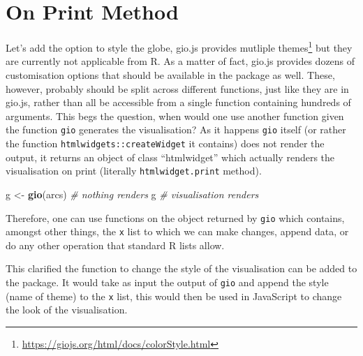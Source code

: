 \documentclass[
]{krantz}
\makeatletter
\newenvironment{Shaded}{\begin{snugshade}}{\end{snugshade}}
\newcommand{\CommentTok}[1]{\textcolor[rgb]{0.37,0.37,0.37}{\textit{#1}}}
\newcommand{\KeywordTok}[1]{\textcolor[rgb]{0.27,0.27,0.27}{\textbf{#1}}}
\newcommand{\NormalTok}[1]{#1}
\newcommand{\OperatorTok}[1]{\textcolor[rgb]{0.43,0.43,0.43}{\textbf{#1}}}
\newcommand{\StringTok}[1]{\textcolor[rgb]{0.5,0.5,0.5}{#1}}
\renewcommand{\href}[2]{#2\footnote{\url{#1}}}
\newenvironment{kframe}{%
\medskip{}
\setlength{\fboxsep}{.8em}
 \def\at@end@of@kframe{}%
 \ifinner\ifhmode%
  \def\at@end@of@kframe{\end{minipage}}%
  \begin{minipage}{\columnwidth}%
 \fi\fi%
 \def\FrameCommand##1{\hskip\@totalleftmargin \hskip-\fboxsep
 \colorbox{shadecolor}{##1}\hskip-\fboxsep
     \hskip-\linewidth \hskip-\@totalleftmargin \hskip\columnwidth}%
 \MakeFramed {\advance\hsize-\width
   \@totalleftmargin\z@ \linewidth\hsize
   \@setminipage}}%
 {\par\unskip\endMakeFramed%
 \at@end@of@kframe}
\renewenvironment{Shaded}{\begin{kframe}}{\end{kframe}}
\makeatother
\begin{document}
\hypertarget{widgets-full-on-print}{%
\section{On Print Method}\label{widgets-full-on-print}}

Let's add the option to style the globe, gio.js provides mutliple \href{https://giojs.org/html/docs/colorStyle.html}{themes} but they are currently not applicable from R. As a matter of fact, gio.js provides dozens of customisation options that should be available in the package as well. These, however, probably should be split across different functions, just like they are in gio.js, rather than all be accessible from a single function containing hundreds of arguments. This begs the question, when would one use another function given the function \texttt{gio} generates the visualisation? As it happens \texttt{gio} itself (or rather the function \texttt{htmlwidgets::createWidget} it contains) does not render the output, it returns an object of class ``htmlwidget'' which actually renders the visualisation on print (literally \texttt{htmlwidget.print} method).

\begin{Shaded}
\begin{Highlighting}[]
\NormalTok{g <{-}}\StringTok{ }\KeywordTok{gio}\NormalTok{(arcs) }\CommentTok{\# nothing renders}
\NormalTok{g }\CommentTok{\# visualisation renders}
\end{Highlighting}
\end{Shaded}

Therefore, one can use functions on the object returned by \texttt{gio} which contains, amongst other things, the \texttt{x} list to which we can make changes, append data, or do any other operation that standard R lists allow.

\begin{Shaded}
\end{Shaded}

This clarified the function to change the style of the visualisation can be added to the package. It would take as input the output of \texttt{gio} and append the style (name of theme) to the \texttt{x} list, this would then be used in JavaScript to change the look of the visualisation.
\end{document}
